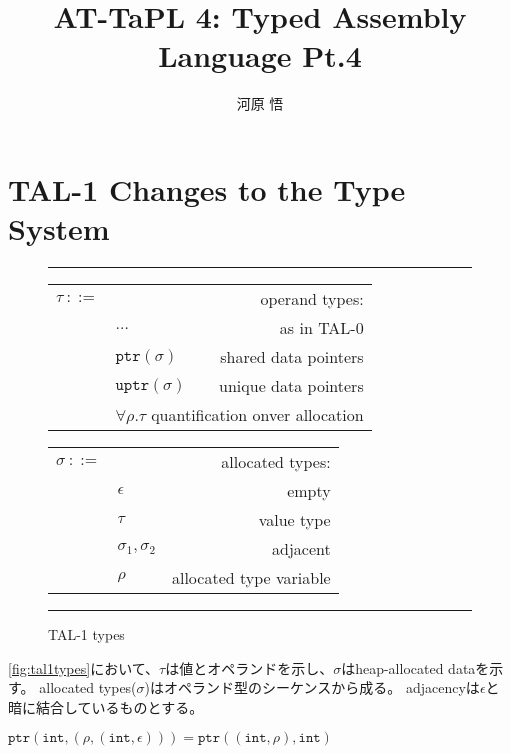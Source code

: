 \documentclass[a4paper,oneside]{ltjsarticle}
\title{AT-TaPL 4: Typed Assembly Language Pt.4}
\author{河原 悟}
\newenvironment{linedenv}%
{\begin{minipage}{\textwidth}
    \noindent\hrule{}}%
    {\noindent\hrule{}
\end{minipage}}
\newenvironment{boxedenv}%
{\begin{linedenv}
    \begin{multicols}{2}}%
    {\end{multicols}
\end{linedenv}}
\begin{document}
\maketitle

\setcounter{section}{3}
\section{TAL-1 Changes to the Type System}
\begin{figure}
    \begin{boxedenv}
        \begin{center}
            \begin{tabular}{llr}
                $\tau\ ::=$&&operand types:\\
                           &$\dots$&as in TAL-0\\
                           &$\mathtt{ptr}(\sigma)$&shared data pointers\\
                           &$\mathtt{uptr}(\sigma)$&unique data pointers\\
                           &\multicolumn{2}{l}{$\forall \rho.\tau$ quantification onver allocation}
            \end{tabular}
            \begin{tabular}{llr}
                $\sigma\ ::=$&&allocated types:\\
                             &$\epsilon$&empty\\
                             &$\tau$&value type\\
                             &$\sigma_1,\sigma_2$&adjacent\\
                             &$\rho$&allocated type variable
            \end{tabular}
        \end{center}
    \end{boxedenv}
    \caption{TAL-1 types}
    \label{fig:tal1types}
\end{figure}

\autoref{fig:tal1types}において、$\tau$は値とオペランドを示し、$\sigma$はheap-allocated dataを示す。
allocated types($\sigma$)はオペランド型のシーケンスから成る。
adjacencyは$\epsilon$と暗に結合しているものとする。

$\mathtt{ptr}\left(\mathtt{int}, \left(\rho, \left(\mathtt{int}, \epsilon\right)\right)\right) = \mathtt{ptr}\left(\left(\mathtt{int}, \rho\right), \mathtt{int}\right)$
\end{document}
